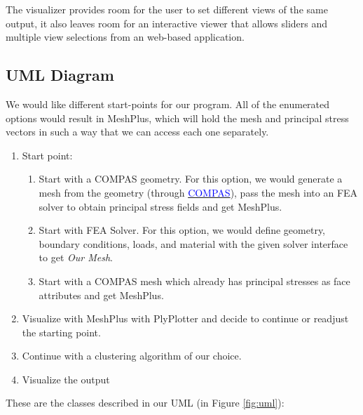 \documentclass[11pt]{article}
\begin{document}
The visualizer  provides room for the user to set different views of the same output, it also leaves room for an interactive viewer that allows sliders and multiple view selections from an web-based application.



\subsection{UML Diagram}
We would like different start-points for our program. All of the enumerated options would result in MeshPlus, which will hold the mesh and principal stress vectors in such a way that we can access each one separately.
\begin{enumerate}
    \item Start point:
    \begin{enumerate}
        \item Start with a COMPAS geometry. \newline
For this option, we would generate a mesh from the geometry (through \href{https://compas.dev/plugins.html}{\textcolor{blue}{COMPAS}}), pass the mesh into an FEA solver to obtain principal stress fields and get MeshPlus.
        \item Start with FEA Solver. \newline
For this option, we would define geometry, boundary conditions, loads, and material with the given solver interface to get \emph{Our Mesh}.
        \item Start with a COMPAS mesh which already has principal stresses as face attributes and get MeshPlus.
    \end{enumerate}
    
    \item Visualize with MeshPlus with PlyPlotter and decide to continue or readjust the starting point.
    \item Continue with a clustering algorithm of our choice.
    \item Visualize the output
\end{enumerate}

These are the classes described in our UML (in Figure \ref{fig:uml}):
\end{document}
